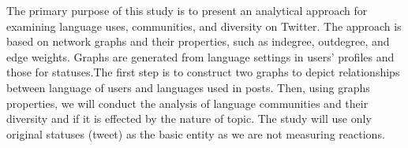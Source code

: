 \documentclass{llncs}
\begin{document}
The primary purpose of this study is to present an analytical approach for 
examining language uses, communities, and diversity on Twitter. The approach 
is based on network graphs and their properties, such as indegree, outdegree, 
and edge weights. Graphs are generated from language settings in users' 
profiles and those for statuses.The first step is to construct two graphs to depict
relationships between language of users and languages used in posts. 
Then, using graphs properties, we will conduct the analysis of language 
communities and their diversity and if it is effected by the nature of topic. The 
study will use only original statuses (tweet) as the basic entity as we are not 
measuring reactions.




\end{document}
